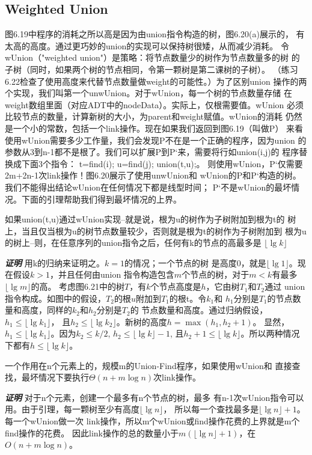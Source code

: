 \subsection{Weighted Union}
图6.19中程序的消耗之所以高是因为由union指令构造的树，图6.20(a)展示的，
有太高的高度。通过更巧妙的union的实现可以保持树很矮，从而减少消耗。
令wUnion（"weighted union"）是策略：将节点数量少的树作为节点数量多的树
的子树（同时，如果两个树的节点相同，令第一颗树是第二课树的子树）。
（练习6.22检查了使用高度来代替节点数量做weight的可能性。）为了区别union
操作的两个实现，我们叫第一个unwUnion。对于wUnion，每一个树的节点数量存储
在weight数组里面（对应ADT中的nodeData）。实际上，仅根需要值。wUnion
必须比较节点的数量，计算新树的大小，为parent和weight赋值。wUnion的消耗
仍然是一个小的常数，包括一个link操作。现在如果我们返回到图6.19（叫做P）
来看使用wUnion需要多少工作量，我们会发现P不在是一个正确的程序，因为union
的参数从3到n-1都不是根了。我们可以扩展P到P`来，需要将行如union(i,j)的
程序替换成下面3个指令：
t=find(i);
u=find(j);
union(t,u);。
则使用wUnion，P`仅需要2m+2n-1次link操作！图6.20展示了使用unwUnion和
wUnion的P和P`构造的树。我们不能得出结论wUnion在任何情况下都是线型时间；
P`不是wUnion的最坏情况。下面的引理帮助我们得到最坏情况的上界。

\begin{lemma}
如果union(t,u)通过wUnion实现--就是说，根为u的树作为子树附加到根为t的
树上，当且仅当根为u的树节点数量较少，否则就是根为t的树作为子树附加到
根为u的树上--则，在任意序列的union指令之后，任何有k的节点的高最多是
$\lfloor \lg k\rfloor$

{\textbf{\emph{证明}}} 用k的归纳来证明之。$k=1$的情况；一个节点的树
是高度0，就是$\lfloor \lg 1\rfloor$。现在假设$k>1$，并且任何由union
指令构造包含$m$个节点的树，对于$m<k$有最多$\lfloor \lg m\rfloor$的高。
考虑图6.21中的树$T$，有$k$个节点高度是$h$，它由树$T_1$和$T_2$通过
union指令构成。如图中的假设，$T_2$的根$u$附加到$T_1$的根t。令$k_1$和
$h_1$分别是$T_1$的节点数量和高度，同样的$k_2$和$h_2$分别是$T_2$的
节点数量和高度。通过归纳假设，$h_1\leq \lfloor \lg k_1\rfloor$，
且$h_2\leq \lfloor \lg k_2\rfloor$。新树的高度$h=\max(h_1, h_2+1)$。
显然，$h_1\leq \lfloor \lg k_1\rfloor$。因为$k_2\leq k/2$, $h_2\leq \lfloor \lg k\rfloor-1$,
且$h_2+1 \leq \lfloor \lg k\rfloor$。所以两种情况下都有$h\leq \lfloor \lg k\rfloor$。

\end{lemma}

\begin{theorem}
一个作用在n个元素上的，规模m的Union-Find程序，如果使用wUnion和
直接查找，最坏情况下要执行$\Theta(n+m\log n)$次link操作。

{\textbf{\emph{证明}}}  对于n个元素，创建一个最多有n个节点的树，最多
有n-1次wUnion指令可以用。由于引理，每一颗树至少有高度$\lfloor \lg n \rfloor$，
所以每一个查找最多是$\lfloor \lg n \rfloor+1$。每一个wUnion做一次
link操作，所以m个wUnion或find操作花费的上界就是m个find操作的花费。
因此link操作的总的数量小于$m(\lfloor \lg n \rfloor+1)$，在$O(n+m\log n)$。
\end{theorem}


